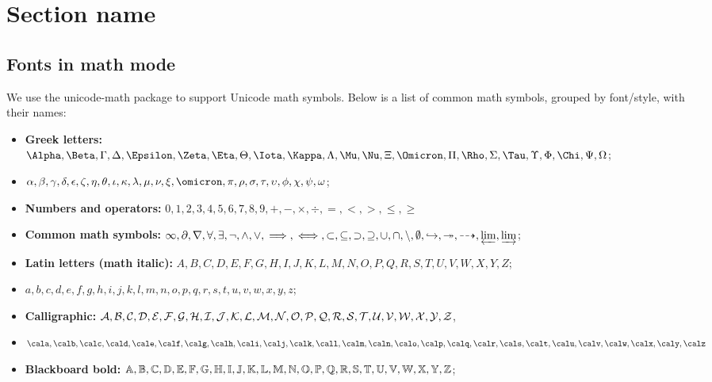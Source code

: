 \section{Section name}

\subsection{Fonts in math mode}

    We use the unicode-math package to support Unicode math symbols. Below is a list of common math symbols, grouped by font/style, with their names:

    \begin{itemize}
        \item \textbf{Greek letters:} \(\Alpha, \Beta, \Gamma, \Delta, \Epsilon, \Zeta, \Eta, \Theta, \Iota, \Kappa, \Lambda, \Mu, \Nu, \Xi, \Omicron, \Pi, \Rho, \Sigma, \Tau, \Upsilon, \Phi, \Chi, \Psi, \Omega\); 
        \item \(\alpha, \beta, \gamma, \delta, \epsilon, \zeta, \eta, \theta, \iota, \kappa, \lambda, \mu, \nu, \xi, \omicron, \pi, \rho, \sigma, \tau, \upsilon, \phi, \chi, \psi, \omega\);
        \item \textbf{Numbers and operators:} \(0, 1, 2, 3, 4, 5, 6, 7, 8, 9, +, -, \times, \div, =, <, >, \leq, \geq\)
        \item \textbf{Common math symbols:} \(\infty, \partial, \nabla, \forall, \exists, \neg, \land, \lor, \implies, \iff, \subset, \subseteq, \supset, \supseteq, \cup, \cap, \setminus, \emptyset,\hookrightarrow,\twoheadrightarrow,\dasharrow,\varprojlim,\varinjlim\);
        \item \textbf{Latin letters (math italic):} \(A, B, C, D, E, F, G, H, I, J, K, L, M, N, O, P, Q, R, S, T, U, V, W, X, Y, Z\); 
        \item \(a, b, c, d, e, f, g, h, i, j, k, l, m, n, o, p, q, r, s, t, u, v, w, x, y, z\);
        \item \textbf{Calligraphic:} ${\mathcal{A}}, {\mathcal{B}}, {\mathcal{C}}, {\mathcal{D}}, {\mathcal{E}}, {\mathcal{F}}, {\mathcal{G}}, {\mathcal{H}}, {\mathcal{I}}, {\mathcal{J}}, {\mathcal{K}}, {\mathcal{L}}, {\mathcal{M}}, {\mathcal{N}}, {\mathcal{O}}, {\mathcal{P}}, {\mathcal{Q}}, {\mathcal{R}}, {\mathcal{S}}, {\mathcal{T}}, {\mathcal{U}}, {\mathcal{V}}, {\mathcal{W}}, {\mathcal{X}}, {\mathcal{Y}}, {\mathcal{Z}}$, 
        \item $\cala, \calb, \calc, \cald, \cale, \calf, \calg, \calh, \cali, \calj, \calk, \call, \calm, \caln, \calo, \calp, \calq, \calr, \cals, \calt, \calu, \calv, \calw, \calx, \caly, \calz$
        \item \textbf{Blackboard bold:} \({\mathbb{A}}, {\mathbb{B}}, {\mathbb{C}}, {\mathbb{D}}, {\mathbb{E}}, {\mathbb{F}}, {\mathbb{G}}, {\mathbb{H}}, {\mathbb{I}}, {\mathbb{J}}, {\mathbb{K}}, {\mathbb{L}}, {\mathbb{M}}, {\mathbb{N}}, {\mathbb{O}}, {\mathbb{P}}, {\mathbb{Q}}, {\mathbb{R}}, {\mathbb{S}}, {\mathbb{T}}, {\mathbb{U}}, {\mathbb{V}}, {\mathbb{W}}, {\mathbb{X}}, {\mathbb{Y}}, {\mathbb{Z}}\);

\end{itemize}
